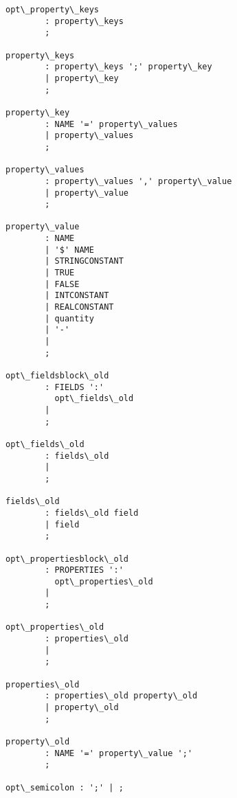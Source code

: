 \begin{Verbatim}[commandchars=\\\{\}]
opt\_property\_keys
        : property\_keys
        ;

property\_keys
        : property\_keys ';' property\_key
        | property\_key
        ;

property\_key
        : NAME '=' property\_values
        | property\_values
        ;

property\_values
        : property\_values ',' property\_value
        | property\_value
        ;

property\_value
        : NAME
        | '$' NAME
        | STRINGCONSTANT
        | TRUE
        | FALSE
        | INTCONSTANT
        | REALCONSTANT
        | quantity
        | '-'
        |
        ;

opt\_fieldsblock\_old
        : FIELDS ':'
          opt\_fields\_old
        |
        ;

opt\_fields\_old
        : fields\_old
        |
        ;

fields\_old
        : fields\_old field
        | field
        ;

opt\_propertiesblock\_old
        : PROPERTIES ':'
          opt\_properties\_old
        |
        ;

opt\_properties\_old
        : properties\_old
        |
        ;

properties\_old
        : properties\_old property\_old
        | property\_old
        ;

property\_old
        : NAME '=' property\_value ';'
        ;

opt\_semicolon : ';' | ;

\end{Verbatim}



